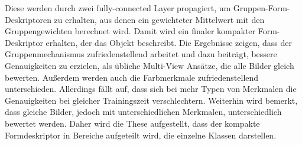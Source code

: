 \documentclass[a4paper,            	%
               12pt,               	%
               chapterprefix,      	%
               appendixprefix,		%
               headsepline,        	%
               twoside,				%
               draft=false]         %
               {scrbook}			%
\theoremstyle{defstyle}
\theoremstyle{bspstyle}
\begin{document}
\begin{BaMaAbstract}
{	Diese werden durch zwei fully-connected Layer propagiert, um Gruppen-Form-Deskriptoren zu erhalten, aus denen ein gewichteter Mittelwert mit den Gruppengewichten berechnet wird.
	Damit wird ein finaler kompakter Form-Deskriptor erhalten, der das Objekt beschreibt.
	Die Ergebnisse zeigen, dass der Gruppenmechanismus zufriedenstellend arbeitet und dazu beiträgt, bessere Genauigkeiten zu erzielen, als übliche Multi-View Ansätze, die alle Bilder gleich bewerten.
	Außerdem werden auch die Farbmerkmale zufriedenstellend unterschieden.
	Allerdings fällt auf, dass sich bei mehr Typen von Merkmalen die Genauigkeiten bei gleicher Trainingszeit verschlechtern.
	Weiterhin wird bemerkt, dass gleiche Bilder, jedoch mit unterschiedlichen Merkmalen, unterschiedlich bewertet werden.
	Daher wird die These aufgestellt, dass der kompakte Formdeskriptor in Bereiche aufgeteilt wird, die einzelne Klassen darstellen.
}
\end{BaMaAbstract}

\setcounter{secnumdepth}{4} %
\tableofcontents		%
\listoffigures			%
\listoftables			%
 
\markboth{\nomname}{\nomname}  %
\printnomenclature     %

 
\mainmatter				%









\backmatter			%

\begingroup
\raggedright\sloppy
\endgroup

\end{document}
